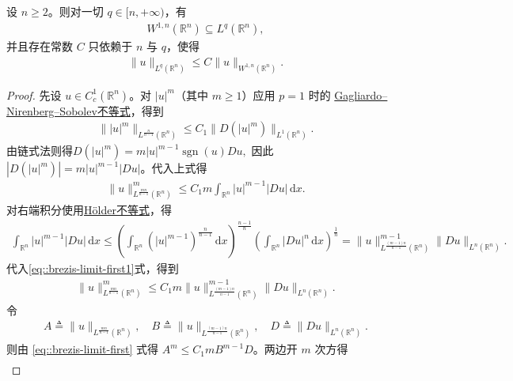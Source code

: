 \documentclass[../../main.tex]{subfiles}
\begin{document}
\begin{corollary}\label{corollary:Sobolev嵌入Lqq大于n}
设 $n \geqslant 2$。则对一切 $q \in [n, +\infty)$，有
\begin{align*}
W^{1,n}(\mathbb{R}^n) \subseteq L^q(\mathbb{R}^n),
\end{align*}
并且存在常数 $C$ 只依赖于 $n$ 与 $q$，使得
\begin{align*}
\|u\|_{L^q(\mathbb{R}^n)} \leqslant C\|u\|_{W^{1,n}(\mathbb{R}^n)}.
\end{align*}
\end{corollary}
\begin{proof}

先设 $u \in C_c^1(\mathbb{R}^n)$。对 $|u|^m$（其中 $m \geqslant 1$）应用 $p=1$ 时的 \hyperref[theorem:Gagliardo--Nirenberg--Sobolev不等式]{Gagliardo--Nirenberg--Sobolev不等式}，得到
\begin{align*}
\||u|^m\|_{L^{\frac{n}{n-1}}(\mathbb{R}^n)} \leqslant C_1\|D(|u|^m)\|_{L^1(\mathbb{R}^n)}.
\end{align*}
由链式法则得$D(|u|^m) = m|u|^{m-1}\operatorname{sgn}(u)Du,$
因此 $|D(|u|^m)| = m|u|^{m-1}|Du|$。代入上式得
\begin{align}\label{eq::brezis-limit-first1}
\|u\|_{L^{\frac{mn}{n-1}}(\mathbb{R}^n)}^m \leqslant C_1 m \int_{\mathbb{R}^n} |u|^{m-1}|Du| \,\mathrm{d}x.
\end{align}
对右端积分使用\hyperref[Real Analysis-theorem:实变函数--Hölder不等式]{Hölder不等式}，得
\begin{align*}
\int_{\mathbb{R}^n} |u|^{m-1}|Du| \,\mathrm{d}x
\leqslant \left( \int_{\mathbb{R}^n} (|u|^{m-1})^{\frac{n}{n-1}} \,\mathrm{d}x \right)^{\frac{n-1}{n}} \left( \int_{\mathbb{R}^n} |Du|^n \,\mathrm{d}x \right)^{\frac{1}{n}}= \|u\|_{L^{\frac{(m-1)n}{n-1}}(\mathbb{R}^n)}^{m-1} \|Du\|_{L^n(\mathbb{R}^n)}.
\end{align*}
代入\eqref{eq::brezis-limit-first1}式，得到
\begin{align}\label{eq::brezis-limit-first}
\|u\|_{L^{\frac{mn}{n-1}}(\mathbb{R}^n)}^m \leqslant C_1 m\|u\|_{L^{\frac{(m-1)n}{n-1}}(\mathbb{R}^n)}^{m-1}\|Du\|_{L^n(\mathbb{R}^n)}.
\end{align}
令
\begin{align*}
A\triangleq\|u\|_{L^{\frac{mn}{n-1}}(\mathbb{R}^n)},\quad
B\triangleq\|u\|_{L^{\frac{(m-1)n}{n-1}}(\mathbb{R}^n)},\quad
D\triangleq\|Du\|_{L^n(\mathbb{R}^n)}.
\end{align*}
则由 \eqref{eq::brezis-limit-first} 式得 $A^m \leqslant C_1 m B^{m-1}D$。两边开 $m$ 次方得
\begin{align*}

\end{align*}
\end{proof}
\end{document}
